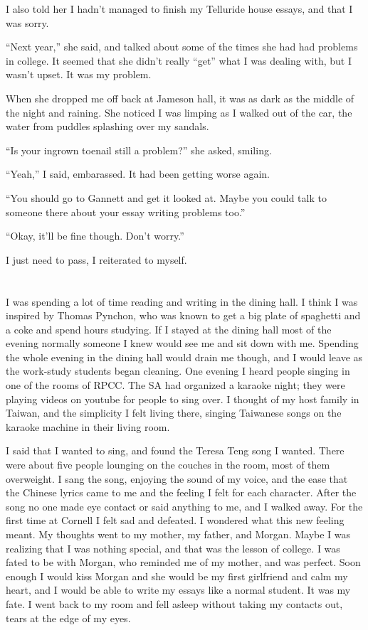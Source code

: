 I also told her I hadn't managed to finish my Telluride house essays, and that I
was sorry.  

``Next year,'' she said, and talked about some of the times she had had problems
in college.  It seemed that she didn't really ``get'' what I was dealing with,
but I wasn't upset.  It was my problem.

When she dropped me off back at Jameson hall, it was as dark as the middle of
the night and raining.  She noticed I was limping as I walked out of the car,
the water from puddles splashing over my sandals.

``Is your ingrown toenail still a problem?'' she asked, smiling.

``Yeah,'' I said, embarassed.  It had been getting worse again.  

``You should go to Gannett and get it looked at.  Maybe you could talk to
someone there about your essay writing problems too.''

``Okay, it'll be fine though.  Don't worry.''

I just need to pass, I reiterated to myself.

\section{}

I was spending a lot of time reading and writing in the dining hall.  I think I
was inspired by Thomas Pynchon, who was known to get a big plate of spaghetti
and a coke and spend hours studying.  If I stayed at the dining hall most of the
evening normally someone I knew would see me and sit down with me.  Spending the
whole evening in the dining hall would drain me though, and I would leave as the
work-study students began cleaning.  One evening I heard people singing in one
of the rooms of RPCC.  The SA had organized a karaoke night; they were playing
videos on youtube for people to sing over.  I thought of my host family in
Taiwan, and the simplicity I felt living there, singing Taiwanese songs on the
karaoke machine in their living room.  

I said that I wanted to sing, and found the Teresa Teng song I wanted.  There
were about five people lounging on the couches in the room, most of them
overweight.  I sang the song, enjoying the sound of my voice, and the ease that
the Chinese lyrics came to me and the feeling I felt for each character.  After
the song no one made eye contact or said anything to me, and I walked away.  For
the first time at Cornell I felt sad and defeated.  I wondered what this new
feeling meant.  My thoughts went to my mother, my father, and Morgan.  Maybe I
was realizing that I was nothing special, and that was the lesson of college.  I
was fated to be with Morgan, who reminded me of my mother, and was perfect.
Soon enough I would kiss Morgan and she would be my first girlfriend and calm my
heart, and I would be able to write my essays like a normal student.  It was my
fate.  I went back to my room and fell asleep without taking my contacts out,
tears at the edge of my eyes.

